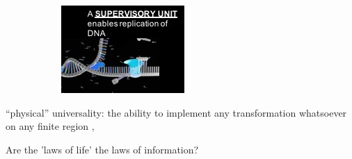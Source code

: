 \documentclass[]{article}
\begin{document}
\begin{figure}[H]
\begin{subfigure}[b]{0.45\textwidth}
		\includegraphics[width=\textwidth]{VonNeumann2}
	\end{subfigure}
\end{figure}

“physical” universality: the ability to implement any transformation whatsoever on any finite region \cite{janzing2010there}, \cite{schaeffer2014physicallyuniversal}

Are the ’laws of life’  the laws of information?

\printglossaries

 


\end{document}
